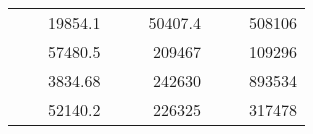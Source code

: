 \begin{table}[H]
\begin{tabular}{|ccrccrccc}
\rowcolor[HTML]{DDFDFF} 
\multicolumn{1}{|c|}{\cellcolor[HTML]{FFFFC7}}                                & \multicolumn{1}{c|}{\cellcolor[HTML]{DDFDFF}}                      & \multicolumn{1}{r|}{\cellcolor[HTML]{DAE8FC}19854.1}   & \multicolumn{1}{c|}{\cellcolor[HTML]{FFFFC7}}                                & \multicolumn{1}{c|}{\cellcolor[HTML]{DDFDFF}}                       & \multicolumn{1}{r|}{\cellcolor[HTML]{DDFDFF}50407.4}   & \multicolumn{1}{c|}{\cellcolor[HTML]{FFFFC7}}                                & \multicolumn{1}{c|}{\cellcolor[HTML]{DDFDFF}}                      & \multicolumn{1}{r|}{\cellcolor[HTML]{DDFDFF}508106}    \\ \cline{3-3} \cline{6-6} \cline{9-9} 
\multicolumn{1}{|c|}{\cellcolor[HTML]{FFFFC7}}                                & \multicolumn{1}{c|}{\cellcolor[HTML]{DDFDFF}}                      & \multicolumn{1}{r|}{\cellcolor[HTML]{DDFDFF}57480.5}   & \multicolumn{1}{c|}{\cellcolor[HTML]{FFFFC7}}                                & \multicolumn{1}{c|}{\cellcolor[HTML]{DDFDFF}}                       & \multicolumn{1}{r|}{\cellcolor[HTML]{DAE8FC}209467}    & \multicolumn{1}{c|}{\cellcolor[HTML]{FFFFC7}}                                & \multicolumn{1}{c|}{\cellcolor[HTML]{DDFDFF}}                      & \multicolumn{1}{r|}{\cellcolor[HTML]{DAE8FC}109296}    \\ \cline{3-3} \cline{6-6} \cline{9-9} 
\rowcolor[HTML]{DDFDFF} 
\multicolumn{1}{|c|}{\cellcolor[HTML]{FFFFC7}}                                & \multicolumn{1}{c|}{\cellcolor[HTML]{DDFDFF}}                      & \multicolumn{1}{r|}{\cellcolor[HTML]{DAE8FC}3834.68}   & \multicolumn{1}{c|}{\cellcolor[HTML]{FFFFC7}}                                & \multicolumn{1}{c|}{\cellcolor[HTML]{DDFDFF}}                       & \multicolumn{1}{r|}{\cellcolor[HTML]{DDFDFF}242630}    & \multicolumn{1}{c|}{\cellcolor[HTML]{FFFFC7}}                                & \multicolumn{1}{c|}{\cellcolor[HTML]{DDFDFF}}                      & \multicolumn{1}{r|}{\cellcolor[HTML]{DDFDFF}893534}    \\ \cline{3-3} \cline{6-6} \cline{9-9} 
\multicolumn{1}{|c|}{\cellcolor[HTML]{FFFFC7}}                                & \multicolumn{1}{c|}{\cellcolor[HTML]{DDFDFF}}                      & \multicolumn{1}{r|}{\cellcolor[HTML]{DDFDFF}52140.2}   & \multicolumn{1}{c|}{\cellcolor[HTML]{FFFFC7}}                                & \multicolumn{1}{c|}{\cellcolor[HTML]{DDFDFF}}                       & \multicolumn{1}{r|}{\cellcolor[HTML]{DAE8FC}226325}    & \multicolumn{1}{c|}{\cellcolor[HTML]{FFFFC7}}                                & \multicolumn{1}{c|}{\cellcolor[HTML]{DDFDFF}}                      & \multicolumn{1}{r|}{\cellcolor[HTML]{DAE8FC}317478}    \\ \cline{3-3} \cline{6-6} \cline{9-9} 

\end{tabular}
\end{table}
